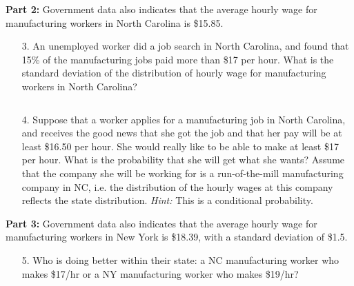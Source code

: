 \documentclass[12pt]{article}
\newcommand{\soln}[2]{$\:$\\ \vspace{#1}}{}
\begin{document}
\pagebreak

\textbf{Part 2:}
Government data also indicates that the average hourly wage for manufacturing workers in North Carolina is \$15.85. 

\begin{enumerate}

\item[3.] An unemployed worker did a job search in North Carolina, and found that 15\% of the manufacturing jobs paid 
more than \$17 per hour. What is the standard deviation of the distribution of hourly wage for manufacturing workers in 
North Carolina?

\soln{4cm}{
Given: $\mu = 15.85$, $P(X_{NC} > 17) = 0.15$ \\
This corresponds to a Z score of 1.04 since $P(Z > 1.04) = 0.15$ 
\[ 1.04 = \frac{17 - 15.85}{\sigma} \rightarrow \sigma = \frac{17 - 15.85}{1.04} = 1.11 \]
}

\item[4.] Suppose that a worker applies for a manufacturing job in North Carolina, and receives the good news that she 
got the job and that her pay will be at least \$16.50 per hour. She would really like to be able to make at least \$17 per 
hour. What is the probability that she will get what she wants? Assume that the company she will be working for is a 
run-of-the-mill manufacturing company in NC, i.e. the distribution of the hourly wages at this company reflects the state 
distribution. \textit{Hint:} This is a conditional probability. \\

\soln{6cm}{
Given: $X_{NC} \sim N(\mu = 15.85, \sigma = 1.11)$
\begin{align*}
P(X_{NC} > 17 ~|~ X_{NC} > 16.50) &= \frac{P(X_{NC} > 17 ~and~ X_{NC} > 16.50)}{P(X_{NC} > 16.50)} = \frac{P(X_{NC} > 17)}{P(X_{NC} > 16.50)} \\
&= \frac{0.15}{P\left( Z > \frac{16.50 - 15.85}{1.11} \right)} = \frac{0.15}{P(Z > 0.59)} = \frac{0.15}{0.28} = 0.53
\end{align*}
}

\end{enumerate}

\textbf{Part 3:}
Government data also indicates that the average hourly wage for manufacturing workers in New York is \$18.39, with a 
standard deviation of \$1.5. 

\begin{enumerate}

\item[5.] Who is doing better within their state: a NC manufacturing worker who makes \$17/hr or a NY manufacturing 
worker who makes \$19/hr?

\soln{2cm}{
\begin{itemize}
\item Given: $X_{NY} \sim N(\mu = 18.39, \sigma = 1.5) \rightarrow X_{NY} = \$19 \rightarrow Z = \frac{19 - 18.39}{1.5} = 0.41$
\item Given: $X_{NC} \sim N(\mu = 15.85, \sigma = 1.11) \rightarrow X_{NC} = \$17 \rightarrow Z = 1.04$
\end{itemize}
NC manufacturing worker doing better since has a higher Z score.
}

\end{enumerate}
\end{document}
